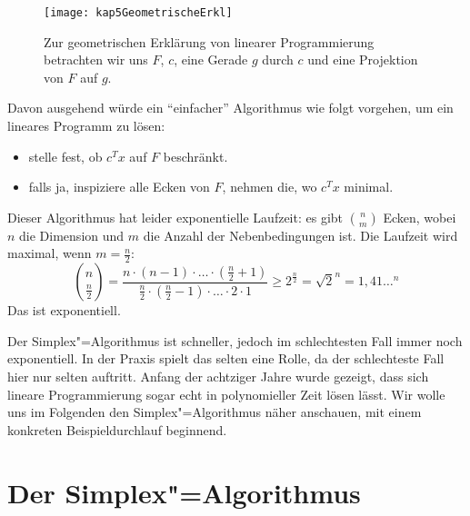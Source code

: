 \begin{figure}[htb]
  \centering
  \texttt{[image: kap5GeometrischeErkl]}
  \caption{Zur geometrischen Erklärung von linearer Programmierung betrachten wir uns $F$, $c$, eine Gerade $g$ durch $c$ und eine Projektion von $F$ auf $g$.}
  \label{kap5GeometrischeErkl}
\end{figure}

Davon ausgehend würde ein "`einfacher"' Algorithmus wie folgt vorgehen, um ein lineares Programm zu lösen:
\begin{itemize}
  \item stelle fest, ob $c^Tx$ auf $F$ beschränkt.
  \item falls ja, inspiziere alle Ecken von $F$, nehmen die, wo $c^Tx$ minimal.
\end{itemize}

Dieser Algorithmus hat leider exponentielle Laufzeit: es gibt $\binom{n}{m}$ Ecken, wobei $n$ die Dimension und $m$ die Anzahl der Nebenbedingungen ist. Die Laufzeit wird maximal, wenn $m = \frac{n}{2}$:
\[\binom{n}{\frac{n}{2}} = \frac{n \cdot (n-1) \cdot \ldots \cdot (\frac{n}{2} +1)}{\frac{n}{2} \cdot (\frac{n}{2} -1) \cdot \ldots \cdot 2 \cdot 1} \ge 2^{\frac{n}{2}} = \sqrt{2}^n = 1,41\ldots^n \]
Das ist exponentiell.

Der Simplex"=Algorithmus ist schneller, jedoch im schlechtesten Fall immer noch exponentiell. In der Praxis spielt das selten eine Rolle, da der schlechteste Fall hier nur selten auftritt. Anfang der achtziger Jahre wurde gezeigt, dass sich lineare Programmierung sogar echt in polynomieller Zeit lösen lässt. Wir wolle uns im Folgenden den Simplex"=Algorithmus näher anschauen, mit einem konkreten Beispieldurchlauf beginnend.

\section{Der Simplex"=Algorithmus}
